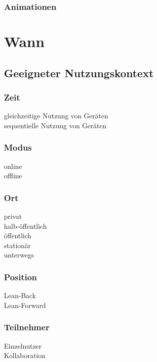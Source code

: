 \subsubsection*{Animationen}
\animations

\section*{Wann}

\subsection*{Geeigneter Nutzungskontext}
\validcontext

\subsubsection*{Zeit}
\checkbox{\simultaneously} gleichzeitige Nutzung von Geräten \\
\checkbox{\sequentially} sequentielle Nutzung von Geräten 

\subsubsection*{Modus}
\checkbox{\online} online \\
\checkbox{\offline} offline 

\subsubsection*{Ort}
\checkbox{\private} privat \\
\checkbox{\semipublic} halb-öffentlich \\
\checkbox{\public} öffentlich \\
\checkbox{\stationary} stationär \\
\checkbox{\onthego} unterwegs 

\subsubsection*{Position}
\checkbox{\leanback} Lean-Back \\
\checkbox{\leanforward} Lean-Forward 

\subsubsection*{Teilnehmer}
\checkbox{\single} Einzelnutzer \\
\checkbox{\collaboration} Kollaboration

